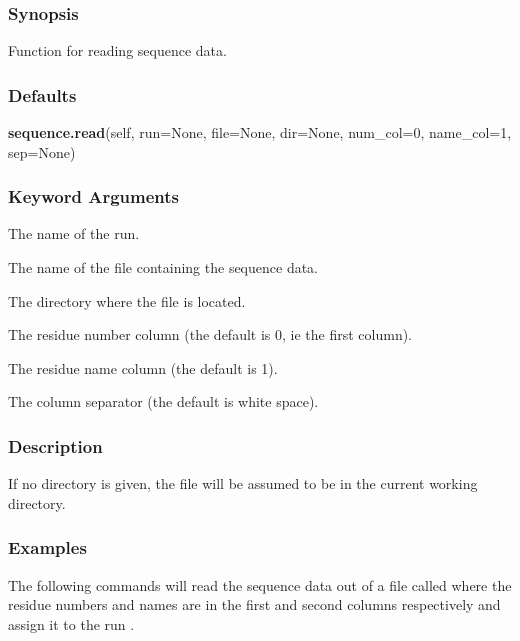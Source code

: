 \subsubsection{Synopsis}

Function for reading sequence data.

\subsubsection{Defaults}

\textsf{\textbf{sequence.read}(self, run=None, file=None, dir=None, num\_col=0, name\_col=1, sep=None)}


\subsubsection{Keyword Arguments}


  The name of the run.

  The name of the file containing the sequence  data.

  The directory where the file is located.

  The residue number column (the default is 0, ie the first column).

  The residue name column (the default is 1).

  The column separator (the default is white space).

\subsubsection{Description}

If no directory is given, the file will be assumed to be in the current working directory.


\subsubsection{Examples}

The following commands will read  the sequence  data out of a file called 
 where the
residue numbers and names are in the first and second columns respectively and assign it to
the run 
.



